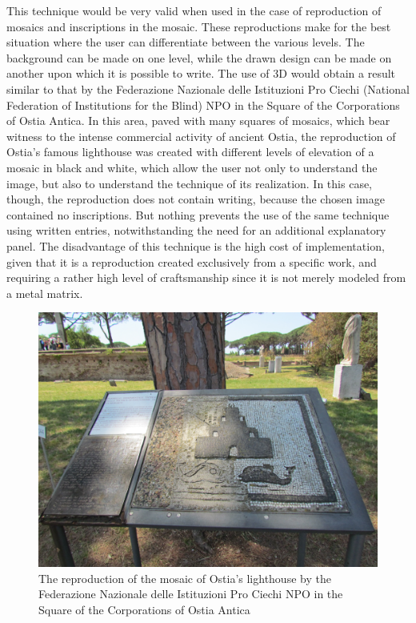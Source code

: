 \documentclass[amsthm,ebook]{saparticle}
\begin{document}
This technique would be very valid when used in the case of reproduction of mosaics and inscriptions in the mosaic.
These reproductions make for the best situation where the user can differentiate between the various levels. The
background can be made on one level, while the drawn design can be made on another upon which it is possible to write. The
use of 3D would obtain a result similar to that by the Federazione Nazionale delle Istituzioni Pro Ciechi (National
Federation of Institutions for the Blind) NPO in the Square of the Corporations of Ostia Antica. In this area, paved
with many squares of mosaics, which bear witness to the intense commercial activity of ancient Ostia, the reproduction
of Ostia’s famous lighthouse was created with different levels of elevation of a mosaic in black and white, which allow
the user not only to understand the image, but also to understand the technique of its realization. In this case,
though, the reproduction does not contain writing, because the chosen image contained no inscriptions. But nothing
prevents the use of the same technique using written entries, notwithstanding the need for an additional explanatory
panel. The disadvantage of this technique is the high cost of implementation, given that it is a reproduction created
exclusively from a specific work, and requiring a rather high level of craftsmanship since it is not merely modeled
from a metal matrix.

\begin{figure}[!hbp]
\centering
 \includegraphics[width=\columnwidth]{8reproductionOstiaslighthouse.JPG}
\caption{The reproduction of the mosaic of Ostia’s lighthouse by the Federazione Nazionale delle Istituzioni Pro Ciechi NPO in the Square of the Corporations of Ostia Antica}
\label{fig:8}
\end{figure}
\end{document}
